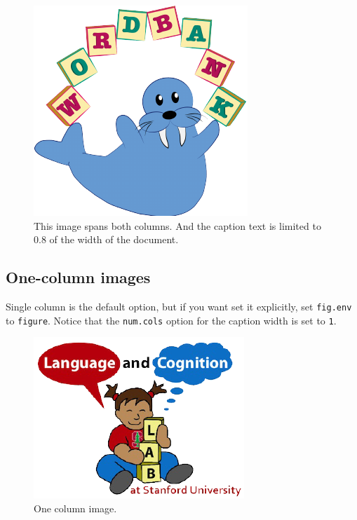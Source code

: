 \documentclass[10pt, letterpaper]{article}
\newenvironment{CodeChunk}{}{}
\begin{document}
\begin{CodeChunk}
\begin{figure}[h]

{\centering \includegraphics{figs/2-col-image-1} 

}

\caption[This image spans both columns]{This image spans both columns. And the caption text is limited to 0.8 of the width of the document.}\label{fig:2-col-image}
\end{figure}
\end{CodeChunk}

\subsection{One-column images}\label{one-column-images}

Single column is the default option, but if you want set it explicitly,
set \texttt{fig.env} to \texttt{figure}. Notice that the
\texttt{num.cols} option for the caption width is set to \texttt{1}.

\begin{CodeChunk}
\begin{figure}[H]

{\centering \includegraphics{figs/image-1} 

}

\caption[One column image]{One column image.}\label{fig:image}
\end{figure}
\end{CodeChunk}
\end{document}
